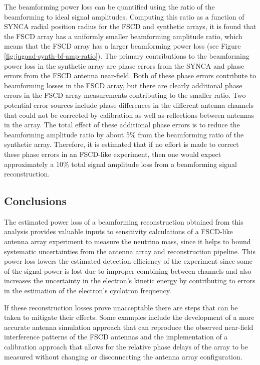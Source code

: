 The beamforming power loss can be quantified using the ratio of the beamforming to ideal signal amplitudes. Computing this ratio as a function of SYNCA radial position radius for the FSCD and synthetic arrays, it is found that the FSCD array has a uniformly smaller beamforming amplitude ratio, which means that the FSCD array has a larger beamforming power loss (see Figure \ref{fig:jugaad-synth-bf-amp-ratio}). The primary contributions to the beamforming power loss in the synthetic array are phase errors from the SYNCA and phase errors from the FSCD antenna near-field. Both of these phase errors contribute to beamforming losses in the FSCD array, but there are clearly additional phase errors in the FSCD array measurements contributing to the smaller ratio. Two potential error sources include phase differences in the different antenna channels that could not be corrected by calibration as well as reflections between antennas in the array. The total effect of these additional phase errors is to reduce the beamforming amplitude ratio by about 5\% from the beamforming ratio of the synthetic array. Therefore, it is estimated that if no effort is made to correct these phase errors in an FSCD-like experiment, then one would expect approximately a 10\% total signal amplitude loss from a beamforming signal reconstruction. 

\subsection{Conclusions}

The estimated power loss of a beamforming reconstruction obtained from this analysis provides valuable inputs to sensitivity calculations of a FSCD-like antenna array experiment to measure the neutrino mass, since it helps to bound systematic uncertainties from the antenna array and reconstruction pipeline. This power loss lowers the estimated detection efficiency of the experiment since some of the signal power is lost due to improper combining between channels and also increases the uncertainty in the electron's kinetic energy by contributing to errors in the estimation of the electron's cyclotron frequency. 

If these reconstruction losses prove unacceptable there are steps that can be taken to mitigate their effects. Some examples include the development of a more accurate antenna simulation approach that can reproduce the observed near-field interference patterns of the FSCD antennas and the implementation of a calibration approach that allows for the relative phase delays of the array to be measured without changing or disconnecting the antenna array configuration. 